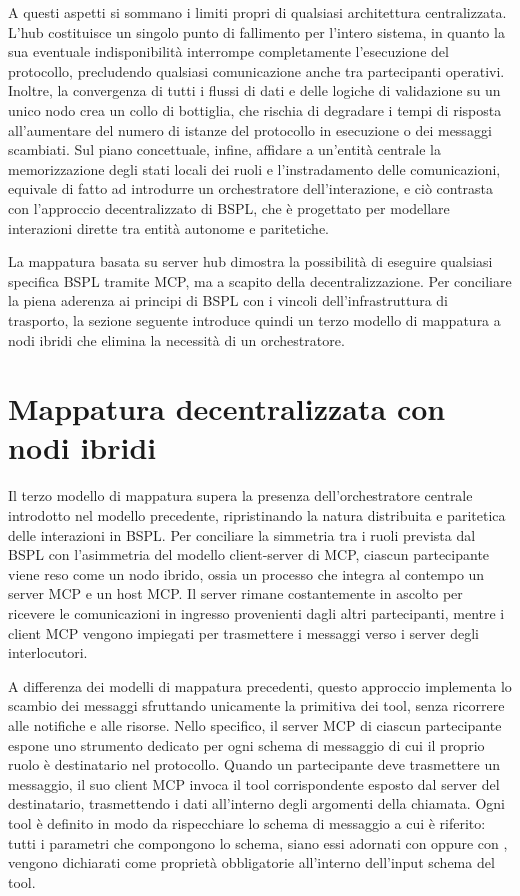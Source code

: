 A questi aspetti si sommano i limiti propri di qualsiasi architettura centralizzata. L'hub costituisce un singolo punto di fallimento per l'intero sistema, in quanto la sua eventuale indisponibilità interrompe completamente l'esecuzione del protocollo, precludendo qualsiasi comunicazione anche tra partecipanti operativi. Inoltre, la convergenza di tutti i flussi di dati e delle logiche di validazione su un unico nodo crea un collo di bottiglia, che rischia di degradare i tempi di risposta all'aumentare del numero di istanze del protocollo in esecuzione o dei messaggi scambiati. Sul piano concettuale, infine, affidare a un'entità centrale la memorizzazione degli stati locali dei ruoli e l'instradamento delle comunicazioni, equivale di fatto ad introdurre un orchestratore dell'interazione, e ciò contrasta con l'approccio decentralizzato di BSPL, che è progettato per modellare interazioni dirette tra entità autonome e paritetiche.

La mappatura basata su server hub dimostra la possibilità di eseguire qualsiasi specifica BSPL tramite MCP, ma a scapito della decentralizzazione. Per conciliare la piena aderenza ai principi di BSPL con i vincoli dell'infrastruttura di trasporto, la sezione seguente introduce quindi un terzo modello di mappatura a nodi ibridi che elimina la necessità di un orchestratore.

\section{Mappatura decentralizzata con nodi ibridi}\label{mappatura-ibrida}

Il terzo modello di mappatura supera la presenza dell'orchestratore centrale introdotto nel modello precedente, ripristinando la natura distribuita e paritetica delle interazioni in BSPL. Per conciliare la simmetria tra i ruoli prevista dal BSPL con l'asimmetria del modello client-server di MCP, ciascun partecipante viene reso come un nodo ibrido, ossia un processo che integra al contempo un server MCP e un host MCP. Il server rimane costantemente in ascolto per ricevere le comunicazioni in ingresso provenienti dagli altri partecipanti, mentre i client MCP vengono impiegati per trasmettere i messaggi verso i server degli interlocutori.

A differenza dei modelli di mappatura precedenti, questo approccio implementa lo scambio dei messaggi sfruttando unicamente la primitiva dei tool, senza ricorrere alle notifiche e alle risorse. Nello specifico, il server MCP di ciascun partecipante espone uno strumento dedicato per ogni schema di messaggio di cui il proprio ruolo è destinatario nel protocollo. Quando un partecipante deve trasmettere un messaggio, il suo client MCP invoca il tool corrispondente esposto dal server del destinatario, trasmettendo i dati all'interno degli argomenti della chiamata.
Ogni tool è definito in modo da rispecchiare lo schema di messaggio a cui è riferito: tutti i parametri che compongono lo schema, siano essi adornati con  oppure con , vengono dichiarati come proprietà obbligatorie all'interno dell'input schema del tool.

